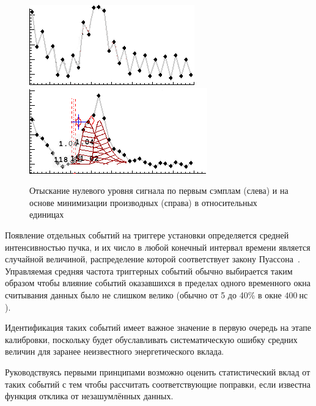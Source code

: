 \begin{figure}
    \centering
    \includegraphics[width=0.33\linewidth]{images//illustrative/baselines-distorted.png}
    \includegraphics[width=0.33\linewidth]{images//illustrative/baselines-corrected.png}
    \caption{Отыскание нулевого уровня сигнала
    по первым сэмплам (слева) и на основе минимизации производных (справа)
    в относительных единицах}
    \label{fig:baselineresults}
\end{figure}


Появление отдельных событий на триггере установки определяется средней
интенсивностью пучка, и их число в любой конечный интервал времени является
случайной величиной, распределение которой соответствует закону
Пуассона~\cite{exp-methods-Abramov1977}.
Управляемая средняя частота триггерных событий
обычно выбирается таким образом чтобы влияние событий оказавшихся в пределах
одного временного окна считывания данных было не слишком велико (обычно
от 5 до 40\% в окне $400~\text{нс}$).

Идентификация таких событий имеет важное значение в первую очередь на этапе
калибровки, поскольку будет обуславливать систематическую ошибку средних
величин для заранее неизвестного энергетического вклада.

\iffalse
Руководствуясь первыми принципами возможно оценить статистический вклад от
таких событий с тем чтобы рассчитать соответствующие поправки, если известна
функция отклика от незашумлённых данных.


